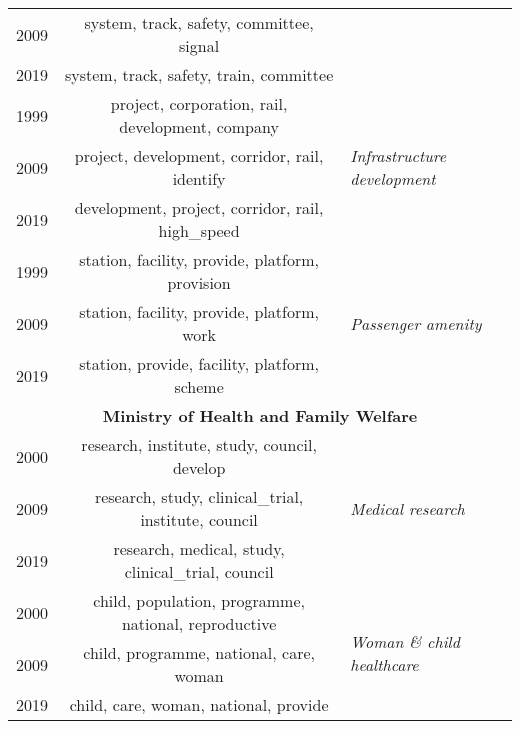 \documentclass[10pt, a4paper]{article}
\begin{document}
\begin{table}[!htbp]
\begin{adjustbox}{width=1\linewidth}
\begin{tabular}{|c|c|l|}
        2009 & system, track, safety, committee, signal & \\ \cline{1-2}
        
        2019 & system, track, safety, train, committee & \\ \hline \hline
        
        1999 & project, corporation, rail, development, company & \multirow{3}{2cm}{\textit{Infrastructure development}} \\ \cline{1-2}
        
        2009 & project, development, corridor, rail, identify & \\ \cline{1-2}
        
        2019 & development, project, corridor, rail, high\_speed & \\ \hline \hline
        
        1999 & station, facility, provide, platform, provision & \multirow{3}{2cm}{\textit{Passenger amenity}} \\ \cline{1-2}
        
        2009 & station, facility, provide, platform, work & \\ \cline{1-2}
        
        2019 & station, provide, facility, platform, scheme & \\ \hline 
        
        
        \multicolumn{3}{|c|}{\textbf{Ministry of Health and Family Welfare}} \\ \hline
        2000 & research, institute, study, council, develop & \multirow{3}{2cm}{\textit{Medical research}} \\ \cline{1-2}
        2009 & research, study, clinical\_trial, institute, council & \\ \cline{1-2}
        2019 & research, medical, study, clinical\_trial, council & \\ \hline \hline
        
        2000 & child, population, programme, national, reproductive & \multirow{3}{2cm}{\textit{Woman \& child healthcare}} \\ \cline{1-2}

        2009 & child, programme, national, care, woman & \\ \cline{1-2}

        2019 & child, care, woman, national, provide & \\ \hline \hline
        

\end{tabular}
\end{adjustbox}
\end{table}
\end{document}
